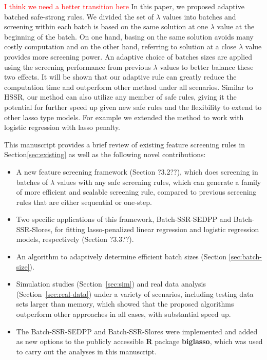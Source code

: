\documentclass{article}
\providecommand{\note}[1]{\textcolor{red}{#1}}
\begin{document}
\note{I think we need a better transition here} In this paper, we proposed adaptive batched safe-strong rules. We divided the set of $\lambda$ values into batches and screening within each batch is based on the same solution at one $\lambda$ value at the beginning of the batch. On one hand, basing on the same solution avoids many costly computation and on the other hand, referring to solution at a close $\lambda$ value provides more screening power. An adaptive choice of batches sizes are applied using the screening performance from previous $\lambda$ values to better balance these two effects. It will be shown that our adaptive rule can greatly reduce the computation time and outperform other method under all scenarios. Similar to HSSR, our method can also utilize any member of safe rules, giving it the potential for further speed up given new safe rules and the flexibility to extend to other lasso type models. For example we extended the method to work with logistic regression with lasso penalty.

This manuscript provides a brief review of existing feature screening rules in Section\ref{sec:existing} as well as the following novel contributions:

\begin{itemize}
    \item A new feature screening framework (Section ?3.2??), which does screening in batches of $\lambda$ values with any safe screening rules, which can generate a family of more efficient and scalable screening rule, compared to previous screening rules that are either sequential or one-step.
    \item Two specific applications of this framework, Batch-SSR-SEDPP and Batch-SSR-Slores, for fitting lasso-penalized linear regression and logistic regression models, respectively (Section ?3.3??).
    \item An algorithm to adaptively determine efficient batch sizes (Section \ref{sec:batch-size}).
    \item Simulation studies (Section~\ref{sec:sim}) and real data analysis (Section~\ref{sec:real-data}) under a variety of scenarios, including testing data sets larger than memory, which showed that the proposed algorithms outperform other approaches in all cases, with substantial speed up.
    \item The Batch-SSR-SEDPP and Batch-SSR-Slores were implemented and added as new options to the publicly accessible \textbf{R} package \textbf{biglasso}\cite{zeng2017biglasso}, which was used to carry out the analyses in this manuscript.
\end{itemize}
\end{document}
